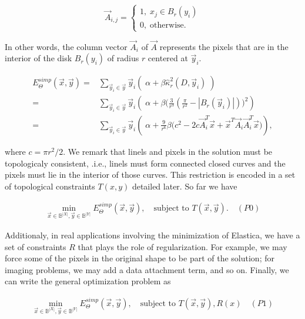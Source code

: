 \[
	\vec{A}_{i,j} = \left\{ \begin{array}{ll}
		1,\; x_j \in B_{r}(y_i)\\
		0,\; \text{otherwise}.
	\end{array}\right.
\]

In other words, the column vector $\vec{A}_i$ of $\vec{A}$ represents the pixels that are in the interior of the disk $B_{r}(y_i)$ of radius $r$ centered at $\vec{y}_i$. 


\begin{align}
	E_{\Theta}^{simp}(\vec{x},\vec{y}) =& \sum_{\vec{y}_i \in \vec{y}}{ \vec{y}_i \left(\; \alpha + \beta \hat{\kappa}_{r}^2(D,\vec{y}_i) \; \right)}\\\nonumber
			   =& \sum_{\vec{y}_i \in \vec{y}}{ \vec{y}_i \left(\; \alpha  + \beta \big( \frac{3}{r^3}(\frac{\pi}{r^2} - |B_r(\vec{y}_i)|)\big)^2\right)}\\\nonumber
			   =& \sum_{\vec{y}_i \in \vec{y}}{ \vec{y}_i \left(\; \alpha + \frac{9}{r^6}\beta \big(c^2 - 2c\vec{A}_i^T\vec{x} + \vec{x}^T\vec{A}_i\vec{A}_i^T\vec{x}\big)\right)},			   
	\end{align}
	
where $c =  \pi r^2/2$. We remark that linels and pixels in the solution must be topologicaly consistent, .i.e., linels must form connected closed curves and the pixels must lie in the interior of those curves. This restriction is encoded in a set of topological constraints $T(x,y)$ detailed later. So far we have

\begin{align*}
	\min_{\vec{x} \in \mathbb{B}^{|X|}, \vec{y} \in \mathbb{B}^{|Y|}}{E_{\Theta}^{simp}(\vec{x},\vec{y})}, \quad \text{subject to } T(\vec{x},\vec{y}). \quad (P0)
\end{align*}

Additionaly, in real applications involving the minimization of Elastica, we have a set of constraints $R$ that plays the role of regularization. For example, we may force some of the pixels in the original shape to be part of the solution; for imaging problems, we may add a data attachment term, and so on. Finally, we can write the general optimization problem as

\begin{align*}
	\min_{\vec{x} \in \mathbb{B}^{|X|}, \vec{y} \in \mathbb{B}^{|Y|}}{E_{\Theta}^{simp}(\vec{x},\vec{y})}, \quad \text{subject to } T(\vec{x},\vec{y}), R(x) \quad (P1)
\end{align*}

